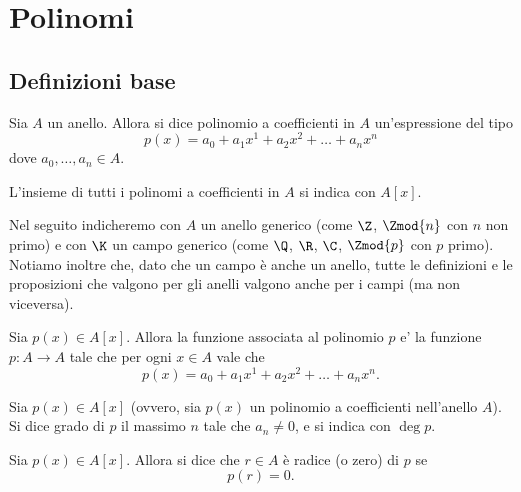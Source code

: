 \chapter{Polinomi}

\section{Definizioni base}

\begin{definition}[Polinomio]
    Sia $A$ un anello. Allora si dice polinomio a coefficienti in $A$ un'espressione del tipo \begin{equation}
        p(x) = a_0 + a_1x^1 + a_2x^2+ \dots + a_nx^n
    \end{equation}
    dove $a_0, \dots, a_n \in A$.

    L'insieme di tutti i polinomi a coefficienti in $A$ si indica con $A[x]$.
\end{definition}

Nel seguito indicheremo con $A$ un anello generico (come $\Z$, $\Zmod{n}$ con $n$ non primo) e con $\K$ un campo generico (come $\Q$, $\R$, $\C$, $\Zmod{p}$ con $p$ primo). Notiamo inoltre che, dato che un campo è anche un anello, tutte le definizioni e le proposizioni che valgono per gli anelli valgono anche per i campi (ma non viceversa).

\begin{definition}
    Sia $p(x) \in A[x]$. Allora la funzione associata al polinomio $p$ e' la funzione $p : A \to A$ tale che per ogni $x \in A$ vale che \[
        p(x) = a_0 + a_1x^1 + a_2x^2+ \dots + a_nx^n. 
    \]
\end{definition}

\begin{definition}
    Sia $p(x) \in A[x]$ (ovvero, sia $p(x)$ un polinomio a coefficienti nell'anello $A$). Si dice grado di $p$ il massimo $n$ tale che $a_n \neq 0$, e si indica con $\deg p$.
\end{definition}

\begin{definition}
    Sia $p(x) \in A[x]$. Allora si dice che $r \in A$ è radice (o zero) di $p$ se \begin{equation}
        p(r) = 0.
    \end{equation}
\end{definition}

